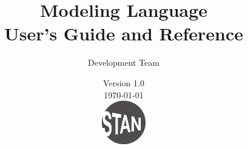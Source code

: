\title{\Huge\bf \Stan Modeling Language \\[4pt] {\LARGE User's Guide and Reference}}
\author{\Stan Development Team}
\date{\vspace*{36pt} \Stan Version 1.0 \\[4pt] {\small \today}
\\
\vfill
\includegraphics[width=0.75in]{../../../logos/stanlogo-main.pdf}}

\maketitle